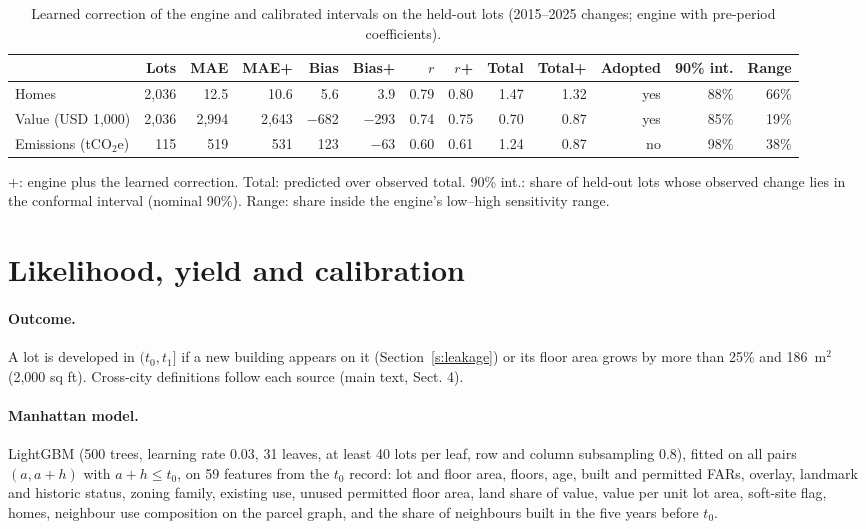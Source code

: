 \documentclass[10pt]{article}
\begin{document}
\begin{table}[t]
\centering
\scriptsize
\setlength{\tabcolsep}{2.5pt}
\caption{Learned correction of the engine and calibrated intervals on the held-out lots (2015--2025 changes; engine with pre-period coefficients).}
\label{tab:s-yield}
\begin{tabular}{lrrrrrrrrrrrr}
\toprule
 & Lots & MAE & MAE+ & Bias & Bias+ & $r$ & $r$+ & Total & Total+ & Adopted & 90\% int. & Range \\
\midrule
Homes & 2{,}036 & 12.5 & 10.6 & 5.6 & 3.9 & 0.79 & 0.80 & 1.47 & 1.32 & yes & 88\% & 66\% \\
Value (USD 1,000) & 2{,}036 & 2{,}994 & 2{,}643 & $-$682 & $-$293 & 0.74 & 0.75 & 0.70 & 0.87 & yes & 85\% & 19\% \\
Emissions (tCO$_2$e) & 115 & 519 & 531 & 123 & $-$63 & 0.60 & 0.61 & 1.24 & 0.87 & no & 98\% & 38\% \\
\bottomrule
\end{tabular}
\par\smallskip
\begin{minipage}{0.95\linewidth}\footnotesize +: engine plus the learned correction. Total: predicted over observed total. 90\% int.: share of held-out lots whose observed change lies in the conformal interval (nominal 90\%). Range: share inside the engine's low--high sensitivity range.\end{minipage}
\end{table}

\section{Likelihood, yield and calibration}\label{s:likely}

\paragraph{Outcome.} A lot is developed in $(t_0, t_1]$ if a new building appears on it (Section~\ref{s:leakage}) or
its floor area grows by more than 25\% and 186~m$^2$ (2,000 sq ft). Cross-city definitions follow each source (main text,
Sect. 4).

\paragraph{Manhattan model.} LightGBM (500 trees, learning rate 0.03, 31 leaves, at least 40 lots per leaf, row and
column subsampling 0.8), fitted on all pairs $(a, a+h)$ with $a + h \leq t_0$, on 59 features from the
$t_0$ record: lot and floor area, floors, age, built and permitted FARs, overlay, landmark and historic status, zoning
family, existing use, unused permitted floor area, land share of value, value per unit lot area, soft-site flag, homes,
neighbour use composition on the parcel graph, and the share of neighbours built in the five years before $t_0$.
\end{document}

